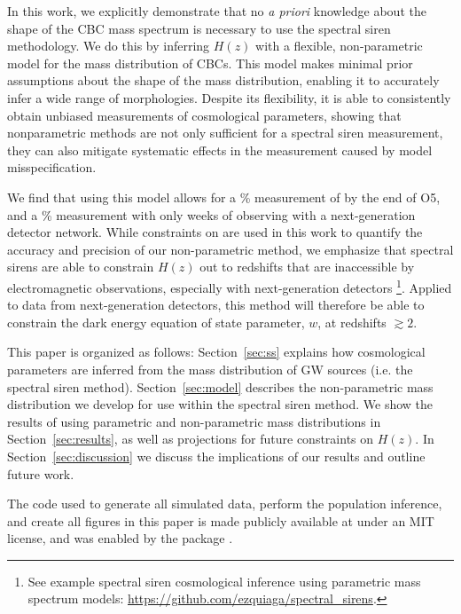 \documentclass[]{aastex631}
\begin{document}
In this work, we explicitly demonstrate that no \emph{a priori} knowledge about the shape of the \ac{CBC} mass spectrum is necessary to use the spectral siren methodology. 
We do this by inferring $H(z)$ with a flexible, non-parametric model for the mass distribution of \acp{CBC}. 
This model makes minimal prior assumptions about the shape of the mass distribution, enabling it to accurately infer a wide range of morphologies.
Despite its flexibility, it is able to consistently obtain unbiased measurements of cosmological parameters, showing that nonparametric methods are not only sufficient for a spectral siren measurement, they can also mitigate systematic effects in the measurement caused by model misspecification.

We find that using this model allows for a \% measurement of \Ho{} by the end of \ac{O5}, and a \% measurement with only  weeks of observing with a next-generation detector network. 
While constraints on \Ho{} are used in this work to quantify the accuracy and precision of our non-parametric method, we emphasize that spectral sirens are able to constrain $H(z)$ out to redshifts that are inaccessible by electromagnetic observations, especially with next-generation detectors \citep{ezquiaga_spectral_2022, Chen:2024gdn, You:2020wju}\footnote{See example spectral siren cosmological inference using parametric mass spectrum models: \href{https://github.com/ezquiaga/spectral_sirens}{https://github.com/ezquiaga/spectral\_sirens}.}.
Applied to data from next-generation detectors, this method will therefore be able to constrain the dark energy equation of state parameter, $w$, at redshifts $\gtrsim 2$.

This paper is organized as follows: Section~\ref{sec:ss} explains how cosmological parameters are inferred from the mass distribution of \ac{GW} sources (i.e. the spectral siren method).
Section~\ref{sec:model} describes the non-parametric mass distribution we develop for use within the spectral siren method.
We show the results of using parametric and non-parametric mass distributions in Section~\ref{sec:results}, as well as projections for future constraints on $H(z)$.
In Section~\ref{sec:discussion} we discuss the implications of our results and outline future work.

The code used to generate all simulated data, perform the population inference, and create all figures in this paper is made publicly available at \GitHubURL under an MIT license, and was enabled by the \showyourwork package \citep{Luger2021}.
\end{document}

